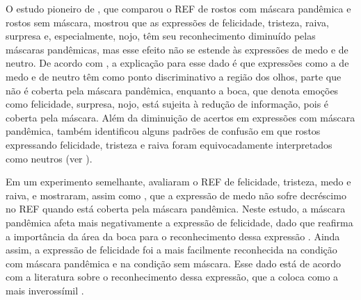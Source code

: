 \documentclass[portuguese]{textolivre}
\begin{document}
O estudo pioneiro de \textcite{carbon_wearing_2020}, que comparou o REF de rostos com máscara pandêmica e rostos sem máscara, mostrou que as expressões de felicidade, tristeza, raiva, surpresa e, especialmente, nojo, têm seu reconhecimento diminuído pelas máscaras pandêmicas, mas esse efeito não se estende às expressões de medo e de neutro. De acordo com  \textcite{wegrzyn_mapping_2017}, a explicação para esse dado é que expressões como a de medo e de neutro têm como ponto discriminativo a região dos olhos, parte que não é coberta pela máscara pandêmica, enquanto a boca, que denota emoções como felicidade, surpresa, nojo, está sujeita à redução de informação, pois é coberta pela máscara. Além da diminuição de acertos em expressões com máscara pandêmica, \textcite{carbon_wearing_2020} também identificou alguns padrões de confusão em que rostos expressando felicidade, tristeza e raiva foram equivocadamente interpretados como neutros (ver ).

Em um experimento semelhante,  \textcite{bani_behind_2021} avaliaram o REF de felicidade, tristeza, medo e raiva, e mostraram, assim como \textcite{carbon_wearing_2020}, que a expressão de medo não sofre decréscimo no REF quando está coberta pela máscara pandêmica. Neste estudo, a máscara pandêmica afeta mais negativamente a expressão de felicidade, dado que reafirma a importância da área da boca para o reconhecimento dessa expressão \cite{ekman_argument_1992, wegrzyn_mapping_2017}. Ainda assim, a expressão de felicidade foi a mais facilmente reconhecida na condição com máscara pandêmica e na condição sem máscara. Esse dado está de acordo com a literatura sobre o reconhecimento dessa expressão, que a coloca como a mais inverossímil \cite{calvo_facial_2008, leppanen_depression_2004, russell_is_1994}.
\end{document}

